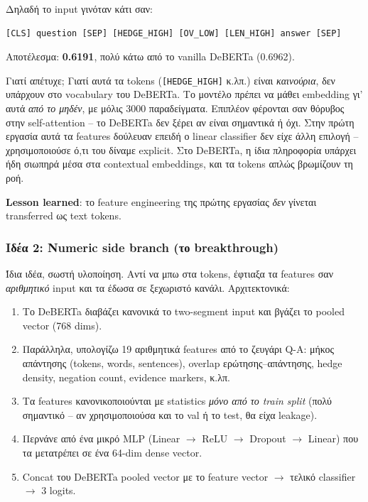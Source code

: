 \documentclass[12pt]{fphw}
\begin{document}
Δηλαδή το input γινόταν κάτι σαν:
\begin{verbatim}
[CLS] question [SEP] [HEDGE_HIGH] [OV_LOW] [LEN_HIGH] answer [SEP]
\end{verbatim}

Αποτέλεσμα: \textbf{0.6191}, πολύ κάτω από το vanilla DeBERTa (0.6962).

Γιατί απέτυχε; Γιατί αυτά τα tokens (\texttt{[HEDGE\_HIGH]} κ.λπ.) είναι \emph{καινούρια}, δεν υπάρχουν στο vocabulary του DeBERTa. Το μοντέλο πρέπει να μάθει embedding γι' αυτά \emph{από το μηδέν}, με μόλις 3000 παραδείγματα. Επιπλέον φέρονται σαν θόρυβος στην self-attention -- το DeBERTa δεν ξέρει αν είναι σημαντικά ή όχι. Στην πρώτη εργασία αυτά τα features δούλευαν επειδή ο linear classifier δεν είχε άλλη επιλογή -- χρησιμοποιούσε ό,τι του δίναμε explicit. Στο DeBERTa, η ίδια πληροφορία υπάρχει ήδη σιωπηρά μέσα στα contextual embeddings, και τα tokens απλώς βρωμίζουν τη ροή.

\textbf{Lesson learned}: το feature engineering της πρώτης εργασίας \emph{δεν} γίνεται transferred ως text tokens.

\subsubsection{Ιδέα 2: Numeric side branch (το breakthrough)}

Ίδια ιδέα, σωστή υλοποίηση. Αντί να μπω στα tokens, έφτιαξα τα features σαν \emph{αριθμητικό} input και τα έδωσα σε ξεχωριστό κανάλι. Αρχιτεκτονικά:

\begin{enumerate}
    \item Το DeBERTa διαβάζει κανονικά το two-segment input και βγάζει το pooled vector (768 dims).
    \item Παράλληλα, υπολογίζω 19 αριθμητικά features από το ζευγάρι Q-A: μήκος απάντησης (tokens, words, sentences), overlap ερώτησης--απάντησης, hedge density, negation count, evidence markers, κ.λπ.
    \item Τα features κανονικοποιούνται με statistics \emph{μόνο από το train split} (πολύ σημαντικό -- αν χρησιμοποιούσα και το val ή το test, θα είχα leakage).
    \item Περνάνε από ένα μικρό MLP (Linear $\rightarrow$ ReLU $\rightarrow$ Dropout $\rightarrow$ Linear) που τα μετατρέπει σε ένα 64-dim dense vector.
    \item Concat του DeBERTa pooled vector με το feature vector $\rightarrow$ τελικό classifier $\rightarrow$ 3 logits.
\end{enumerate}
\end{document}
